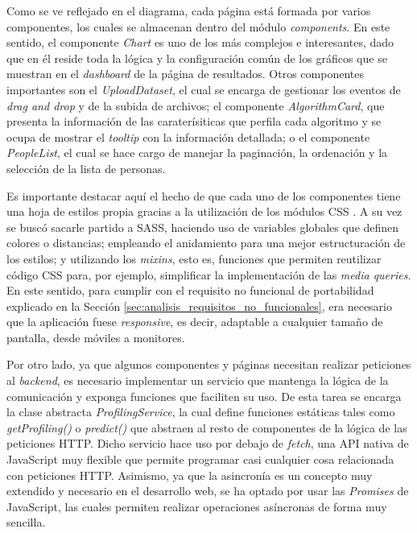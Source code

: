 \bigskip
Como se ve reflejado en el diagrama, cada página está formada por varios componentes, los cuales se almacenan dentro del módulo \textit{components}.
En este sentido, el componente \textit{Chart} es uno de los más complejos e interesantes, dado que en él reside toda la lógica y la configuración común
 de los gráficos que se muestran en el \textit{dashboard} de la página de resultados. Otros componentes importantes son el \textit{UploadDataset},
el cual se encarga de gestionar los eventos de \textit{drag and drop} y de la subida de archivos; el componente \textit{AlgorithmCard}, que
presenta la información de las caraterísiticas que perfila cada algoritmo y se ocupa de mostrar el \textit{tooltip} con la información detallada;
o el componente \textit{PeopleList}, el cual se hace cargo de manejar la paginación, la ordenación y la selección de la lista de personas.

\bigskip
Es importante
destacar aquí el hecho de que cada uno de los componentes tiene una hoja de estilos propia gracias a la utilización de los módulos CSS \cite{cssmodules}. A su vez
se buscó sacarle partido a SASS, haciendo uso de variables globales que definen colores o distancias; empleando el anidamiento para una mejor
estructuración de los estilos; y utilizando los \textit{mixins}, esto es, funciones que permiten reutilizar código CSS para, por ejemplo, simplificar la implementación de las \textit{media queries}. En este
sentido, para cumplir con el requisito no funcional de portabilidad explicado en la Sección \ref{sec:analisis_requisitos_no_funcionales}, 
era necesario que la aplicación fuese \textit{responsive}, es decir, adaptable a cualquier tamaño de pantalla, desde móviles a monitores.


\bigskip
Por otro lado, ya que algunos componentes y páginas necesitan realizar peticiones al \textit{backend}, es necesario implementar un servicio
que mantenga la lógica de la comunicación y exponga funciones que faciliten su uso. De esta tarea se encarga la clase abstracta \textit{ProfilingService},
la cual define funciones estáticas tales como \textit{getProfiling()} o \textit{predict()} que abstraen al resto de componentes de la lógica de las peticiones HTTP.
Dicho servicio hace uso por debajo de \textit{fetch}, una API nativa de JavaScript muy flexible que permite programar casi cualquier cosa
relacionada con peticiones HTTP. Asimismo, ya que la asincronía es un concepto muy extendido y necesario en el desarrollo web, se ha optado
por usar las \textit{Promises} de JavaScript, las cuales permiten realizar operaciones asíncronas de forma muy sencilla.

